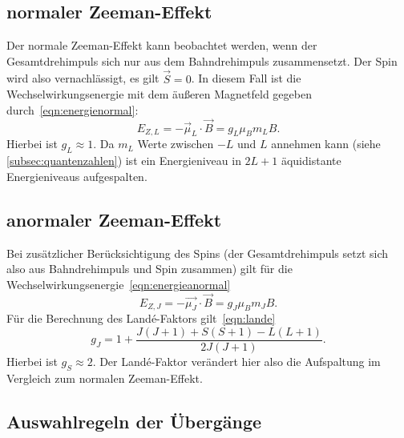 \subsection*{normaler Zeeman-Effekt}
Der normale Zeeman-Effekt kann beobachtet werden, wenn der Gesamtdrehimpuls
sich nur aus dem Bahndrehimpuls zusammensetzt. Der Spin wird also
vernachlässigt, es gilt $\vec{S} = 0$.
In diesem Fall ist die Wechselwirkungsenergie mit dem äußeren Magnetfeld
gegeben durch~\ref{eqn:energienormal}:
\begin{equation}
  E_{Z,L} = - \vec{\mu}_{L} \cdot \vec{B} = g_{L} \mu_{B} m_{L} B.
  \label{eqn:energienormal}
\end{equation}
Hierbei ist $g_{L} \approx 1$.
Da $m_{L}$ Werte zwischen $-L$ und $L$ annehmen kann (siehe \ref{subsec:quantenzahlen})
ist ein Energieniveau in $2L+1$ äquidistante Energieniveaus aufgespalten.
\subsection*{anormaler Zeeman-Effekt}
Bei zusätzlicher Berücksichtigung des Spins (der Gesamtdrehimpuls setzt sich also
aus Bahndrehimpuls und Spin zusammen) gilt für die
Wechselwirkungsenergie~\ref{eqn:energieanormal}
\begin{equation}
 E_{Z, J} = -\vec{\mu_{J}} \cdot \vec{B} = g_{J} \mu_{B}m_{J} B.
 \label{eqn:energieanormal}
\end{equation}
Für die Berechnung des Land\'e-Faktors gilt~\ref{eqn:lande}
\begin{equation}
  g_{J} = 1 + \frac{J(J+1) + S(S+1) - L(L+1)}{2J(J+1)}.
  \label{eqn:lande}
\end{equation}
Hierbei ist $g_{S} \approx 2$. Der Land\'e-Faktor verändert hier also die Aufspaltung
im Vergleich zum normalen Zeeman-Effekt.

\subsection{Auswahlregeln der Übergänge}
\label{subsec:auswahlregeln}

